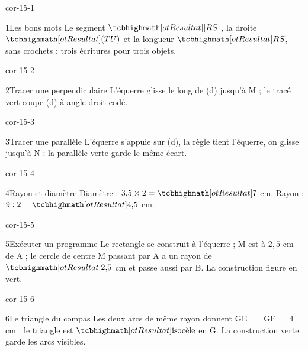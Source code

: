 \clearpage\pagestyle{otMain}\setlength{\otBlocEspacement}{2.5mm}\fontsize{11}{15}\selectfont{}
\begin{blocLivre}{cor-15-1}\begin{corrige}{1}{Les bons mots}
Le segment $\res{[RS]}$, la droite $\res{(TU)}$ et la longueur $\res{RS}$, sans crochets : trois écritures pour trois objets.
\label{fig-cor-15-1}
\end{corrige}\end{blocLivre}
\begin{blocLivre}{cor-15-2}\begin{corrige}{2}{Tracer une perpendiculaire}
L’équerre glisse le long de (d) jusqu’à M ; le tracé vert coupe (d) à angle droit codé.
\label{fig-cor-15-2}
\end{corrige}\end{blocLivre}
\begin{blocLivre}{cor-15-3}\begin{corrige}{3}{Tracer une parallèle}
L’équerre s’appuie sur (d), la règle tient l’équerre, on glisse jusqu’à N : la parallèle verte garde le même écart.
\label{fig-cor-15-3}
\end{corrige}\end{blocLivre}
\begin{blocLivre}{cor-15-4}\begin{corrige}{4}{Rayon et diamètre}
Diamètre : $3{,}5\times2=\res7$ cm. Rayon : $9:2=\res{4{,}5}$ cm.
\label{fig-cor-15-4}
\end{corrige}\end{blocLivre}
\begin{blocLivre}{cor-15-5}\begin{corrige}{5}{Exécuter un programme}
Le rectangle se construit à l’équerre ; M est à $2{,}5$ cm de A ; le cercle de centre M passant par A a un rayon de $\res{2{,}5}$ cm et passe aussi par B. La construction figure en vert.
\label{fig-cor-15-5}
\end{corrige}\end{blocLivre}
\begin{blocLivre}{cor-15-6}\begin{corrige}{6}{Le triangle du compas}
Les deux arcs de même rayon donnent GE $=$ GF $=4$ cm : le triangle est $\res{\text{isocèle}}$ en G. La construction verte garde les arcs visibles.
\label{fig-cor-15-6}
\end{corrige}\end{blocLivre}
